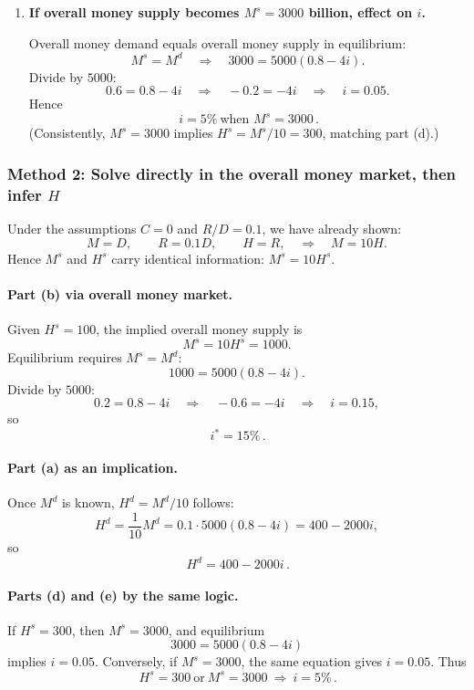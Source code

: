 \documentclass[12pt]{article}
\begin{document}
\begin{enumerate}[label=(\alph*)]
Set \(H^d=H^s=300\):
\[
400-2000i=300
\quad\Longrightarrow\quad
-2000i = -100
\quad\Longrightarrow\quad
i=\frac{100}{2000}=0.05.
\]
So
\[
\boxed{\,i^* = 5\%\ \text{when }H^s=300\, }.
\]

\item \textbf{If overall money supply becomes \(M^s=3000\) billion, effect on \(i\).}

Overall money demand equals overall money supply in equilibrium:
\[
M^s = M^d \quad\Longrightarrow\quad 3000 = 5000(0.8-4i).
\]
Divide by \(5000\):
\[
0.6 = 0.8 - 4i
\quad\Longrightarrow\quad
-0.2 = -4i
\quad\Longrightarrow\quad
i = 0.05.
\]
Hence
\[
\boxed{\,i=5\%\ \text{when }M^s=3000\, }.
\]
(Consistently, \(M^s=3000\) implies \(H^s=M^s/10=300\), matching part (d).)
\end{enumerate}

\subsubsection*{Method 2: Solve directly in the overall money market, then infer \(H\)}
Under the assumptions \(C=0\) and \(R/D=0.1\), we have already shown:
\[
M = D,\qquad R=0.1D,\qquad H=R,
\quad\Rightarrow\quad
M = 10H.
\]
Hence \(M^s\) and \(H^s\) carry identical information: \(M^s=10H^s\).

\paragraph{Part (b) via overall money market.}
Given \(H^s=100\), the implied overall money supply is
\[
M^s = 10H^s = 1000.
\]
Equilibrium requires \(M^s=M^d\):
\[
1000 = 5000(0.8-4i).
\]
Divide by \(5000\):
\[
0.2 = 0.8 - 4i
\quad\Longrightarrow\quad
-0.6 = -4i
\quad\Longrightarrow\quad
i=0.15,
\]
so
\[
\boxed{\,i^*=15\%\, }.
\]

\paragraph{Part (a) as an implication.}
Once \(M^d\) is known, \(H^d=M^d/10\) follows:
\[
H^d = \frac{1}{10}M^d = 0.1\cdot 5000(0.8-4i)=400-2000i,
\]
so
\[
\boxed{\,H^d = 400-2000i\,}.
\]

\paragraph{Parts (d) and (e) by the same logic.}
If \(H^s=300\), then \(M^s=3000\), and equilibrium
\[
3000=5000(0.8-4i)
\]
implies \(i=0.05\). Conversely, if \(M^s=3000\), the same equation gives \(i=0.05\).
Thus
\[
\boxed{\,H^s=300 \ \text{or}\ M^s=3000\ \Longrightarrow\ i=5\%\, }.
\]
\end{document}
